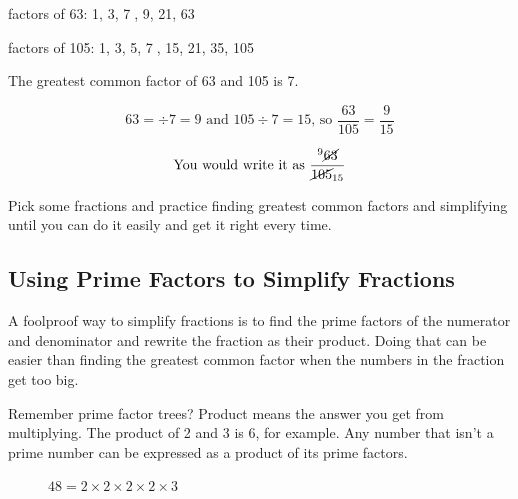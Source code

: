 \documentclass[16pt]{article}
\begin{document}
\begin{spacing}{1.25}
\vspace{28pt}
factors of 63: 1, 3, \textcircled{7,} 9, 21, 63

factors of 105: 1, 3, 5, \textcircled{7,} 15, 21, 35, 105

\vspace{28pt}
The greatest common factor of 63 and 105 is 7.

$$63 = \div 7 = 9 \text{ and }105 \div 7 = 15\text{, so }\frac{63}{105} = \frac{9}{15}$$

$$\text{You would write it as }\frac{^9 \cancel{63}}{\cancel{105}_{15}}$$

\vspace{28pt}
Pick some fractions and practice finding greatest common factors and simplifying until you can do it easily and get it right every time.

\pagebreak

\subsection*{Using Prime Factors to Simplify Fractions}
A foolproof way to simplify fractions is to find the prime factors of the numerator and denominator and rewrite the fraction as their product. Doing that can be easier than finding the greatest common factor when the numbers in the fraction get too big.

Remember prime factor trees? Product means the answer you get from multiplying. The product of 2 and 3 is 6, for example. Any number that isn't a prime number can be expressed as a product of its prime factors.

\begin{figure}[ht]
  \centering
  \begin{minipage}{0.4\textwidth}
    \centering
\caption*{\hspace{1cm}$36 = 2 \times 2 \times 3 \times 3$}
    \label{fig:tree36}
  \end{minipage}%
  \hfill
  \begin{minipage}{0.4\textwidth}
    \centering
    \caption*{\hspace{1cm}$48 = 2 \times 2 \times2 \times 2 \times 3$}
    \label{fig:tree48}
  \end{minipage}
\end{figure}


\end{spacing}
\end{document}
